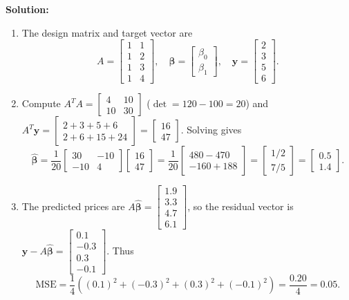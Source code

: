 \documentclass[11pt, letterpaper]{article}
\theoremstyle{definition}
\theoremstyle{remark}
\begin{document}
\textbf{Solution:}
\begin{enumerate}[label=(\alph*)]
    \item The design matrix and target vector are
    \[
    A = \begin{bmatrix} 1 & 1 \\ 1 & 2 \\ 1 & 3 \\ 1 & 4 \end{bmatrix}, \quad \boldsymbol{\beta} = \begin{bmatrix} \beta_0 \\ \beta_1 \end{bmatrix}, \quad \mathbf{y} = \begin{bmatrix} 2 \\ 3 \\ 5 \\ 6 \end{bmatrix}.
    \]
    \item Compute $A^T A = \begin{bmatrix} 4 & 10 \\ 10 & 30 \end{bmatrix}$ ($\det = 120 - 100 = 20$) and $A^T \mathbf{y} = \begin{bmatrix} 2+3+5+6 \\ 2+6+15+24 \end{bmatrix} = \begin{bmatrix} 16 \\ 47 \end{bmatrix}$. Solving gives
    \[
    \hat{\boldsymbol{\beta}} = \frac{1}{20} \begin{bmatrix} 30 & -10 \\ -10 & 4 \end{bmatrix} \begin{bmatrix} 16 \\ 47 \end{bmatrix} = \frac{1}{20} \begin{bmatrix} 480 - 470 \\ -160 + 188 \end{bmatrix} = \begin{bmatrix} 1/2 \\ 7/5 \end{bmatrix} = \begin{bmatrix} 0.5 \\ 1.4 \end{bmatrix}.
    \]
    \item The predicted prices are $A\hat{\boldsymbol{\beta}} = \begin{bmatrix} 1.9 \\ 3.3 \\ 4.7 \\ 6.1 \end{bmatrix}$, so the residual vector is $\mathbf{y} - A\hat{\boldsymbol{\beta}} = \begin{bmatrix} 0.1 \\ -0.3 \\ 0.3 \\ -0.1 \end{bmatrix}$. Thus
    \[
    \text{MSE} = \frac{1}{4}\left((0.1)^2 + (-0.3)^2 + (0.3)^2 + (-0.1)^2\right) = \frac{0.20}{4} = 0.05.
    \]
\end{enumerate}
\end{document}
